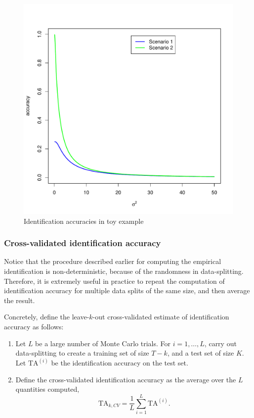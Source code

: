 \begin{figure}
\centering
\includegraphics[scale = 0.5]{../../diagram/ch1_example.pdf}
\caption{Identification accuracies in toy example}
\label{fig:ch1_example}
\end{figure}


\subsubsection{Cross-validated identification accuracy}

Notice that the procedure described earlier for computing the
empirical identification is non-deterministic, because of the
randomness in data-splitting.  Therefore, it is extremely useful in
practice to repeat the computation of identification accuracy for
multiple data splits of the same size, and then average the result.

Concretely, define the leave-$k$-out cross-validated estimate of
identification accuracy as follows:
\begin{enumerate}
\item Let $L$ be a large number of Monte Carlo trials.  For $i =
  1,\hdots, L$, carry out data-splitting to create a training set of
  size $T - k$, and a test set of size $K$.  Let $\text{TA}^{(i)}$ be the
  identification accuracy on the test set.
\item Define the cross-validated identification accuracy as the
  average over the $L$ quantities computed,
\begin{equation}\label{eq:def_cv_ident}
\text{TA}_{k, CV} = \frac{1}{L} \sum_{i=1}^L \text{TA}^{(i)}.
\end{equation}
\end{enumerate}

